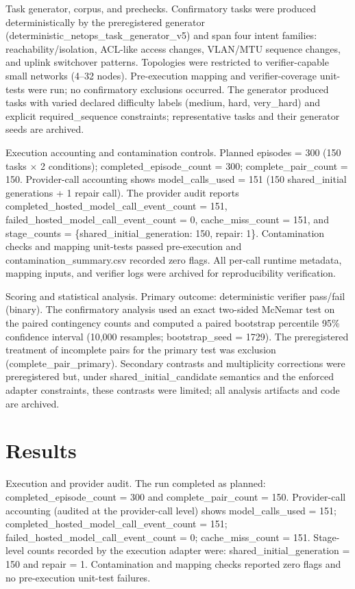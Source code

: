 \documentclass[conference]{IEEEtran}
\begin{document}
Task generator, corpus, and prechecks. Confirmatory tasks were produced deterministically by the preregistered generator (deterministic\_netops\_task\_generator\_v5) and span four intent families: reachability/isolation, ACL-like access changes, VLAN/MTU sequence changes, and uplink switchover patterns. Topologies were restricted to verifier-capable small networks (4--32 nodes). Pre-execution mapping and verifier-coverage unit-tests were run; no confirmatory exclusions occurred. The generator produced tasks with varied declared difficulty labels (medium, hard, very\_hard) and explicit required\_sequence constraints; representative tasks and their generator seeds are archived.

Execution accounting and contamination controls. Planned episodes = 300 (150 tasks \ensuremath{\times} 2 conditions); completed\_episode\_count = 300; complete\_pair\_count = 150. Provider-call accounting shows model\_calls\_used = 151 (150 shared\_initial generations + 1 repair call). The provider audit reports completed\_hosted\_model\_call\_event\_count = 151, failed\_hosted\_model\_call\_event\_count = 0, cache\_miss\_count = 151, and stage\_counts = \{shared\_initial\_generation: 150, repair: 1\}. Contamination checks and mapping unit-tests passed pre-execution and contamination\_summary.csv recorded zero flags. All per-call runtime metadata, mapping inputs, and verifier logs were archived for reproducibility verification.

Scoring and statistical analysis. Primary outcome: deterministic verifier pass/fail (binary). The confirmatory analysis used an exact two-sided McNemar test on the paired contingency counts and computed a paired bootstrap percentile 95\% confidence interval (10,000 resamples; bootstrap\_seed = 1729). The preregistered treatment of incomplete pairs for the primary test was exclusion (complete\_pair\_primary). Secondary contrasts and multiplicity corrections were preregistered but, under shared\_initial\_candidate semantics and the enforced adapter constraints, these contrasts were limited; all analysis artifacts and code are archived.

\section{Results}
Execution and provider audit. The run completed as planned: completed\_episode\_count = 300 and complete\_pair\_count = 150. Provider-call accounting (audited at the provider-call level) shows model\_calls\_used = 151; completed\_hosted\_model\_call\_event\_count = 151; failed\_hosted\_model\_call\_event\_count = 0; cache\_miss\_count = 151. Stage-level counts recorded by the execution adapter were: shared\_initial\_generation = 150 and repair = 1. Contamination and mapping checks reported zero flags and no pre-execution unit-test failures.
\end{document}
